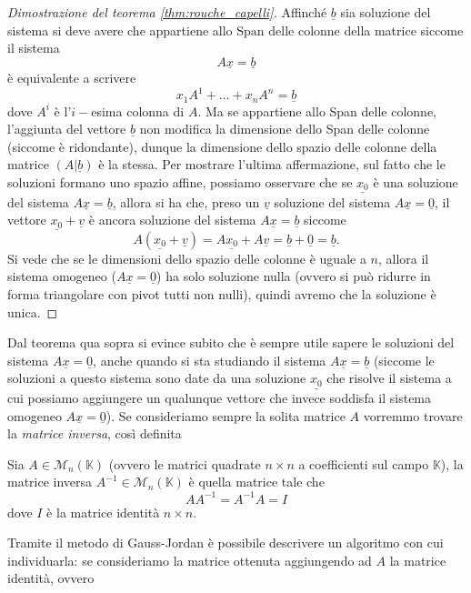 \begin{proof}[Dimostrazione del teorema \ref{thm:rouche_capelli}]
  Affinché $\underline{b}$ sia soluzione del sistema si deve avere che appartiene allo $\text{Span}$ delle colonne della matrice siccome il sistema
  $$
    A \underline{x} = \underline{b}
  $$
  è equivalente a scrivere
  $$
    x_1 A^1 + \ldots + x_n A^n = \underline{b}
  $$
  dove $A^i$ è l'$i-$esima colonna di $A$. Ma se appartiene allo Span delle colonne, l'aggiunta del vettore $\underline{b}$ non modifica la dimensione dello Span delle colonne (siccome è ridondante), dunque la dimensione dello spazio delle colonne della matrice $(A | \underline{b} )$ è la stessa. Per mostrare l'ultima affermazione, sul fatto che le soluzioni formano uno spazio affine, possiamo osservare che se $\underline{x_0}$ è una soluzione del sistema $A \underline{x} = \underline{b}$, allora si ha
  che, preso un $\underline{v}$ soluzione del sistema $A\underline{x} = \underline{0}$, il vettore $\underline{x_0} + \underline{v}$ è ancora soluzione del sistema $A\underline{x} = \underline{b}$ siccome
  $$
    A(\underline{x_0} + \underline{v}) = A\underline{x_0} + A \underline{v} = \underline{b} + \underline{0} = \underline{b}.
  $$
  Si vede che se le dimensioni dello spazio delle colonne è uguale a $n$, allora il sistema omogeneo ($A\underline{x} = \underline{0}$) ha solo soluzione nulla (ovvero si può ridurre in forma triangolare con pivot tutti non nulli), quindi avremo che la soluzione è unica.
\end{proof}
Dal teorema qua sopra si evince subito che è sempre utile sapere le soluzioni del sistema $A \underline{x} = \underline{0}$, anche quando si sta studiando il sistema $A \underline{x} = \underline{b}$ (siccome le soluzioni a questo sistema sono date da una soluzione $\underline{x_0}$ che risolve il sistema a cui possiamo aggiungere un qualunque vettore che invece soddisfa il sistema omogeneo $A \underline{x} = \underline{0}$).
Se consideriamo sempre la solita matrice $A$ vorremmo trovare la \emph{matrice inversa}, così definita
\begin{definition}
  Sia $A \in \mathcal{M}_n(\mathbb{K})$ (ovvero le matrici quadrate $n \times n$ a coefficienti sul campo $\mathbb{K}$), la matrice inversa $A^{-1} \in \mathcal{M}_n(\mathbb{K})$ è quella matrice tale che
  $$
    AA^{-1} = A^{-1} A = I
  $$
  dove $I$ è la matrice identità $n \times n$.
\end{definition}
Tramite il metodo di Gauss-Jordan è possibile descrivere un algoritmo con cui individuarla: se consideriamo la matrice ottenuta aggiungendo ad $A$ la matrice identità, ovvero
